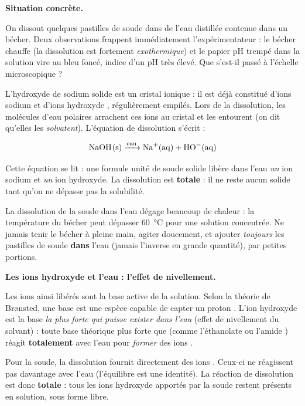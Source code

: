 \documentclass[11pt]{article}
\newcommand{\cle}[1]{{\popxbold\color{popdark}#1}}
\newcounter{popsec}
\newcounter{popsub}
\newcommand{\courssub}[1]{%
  \stepcounter{popsub}%
  \par\vspace{9pt}\noindent{\popxbold\fontsize{11.5}{13}\selectfont\color{popink}{\color{poporange}\thepopsec.\thepopsub}\hspace{6pt}#1}\par\nopagebreak\vspace{4pt}
}
\begin{document}
\courssub{Dissolution de la soude dans l'eau}

\textbf{Situation concrète.}\par
On dissout quelques pastilles de soude dans de l'eau distillée contenue dans un bécher. Deux observations frappent immédiatement l'expérimentateur : le bécher chauffe (la dissolution est fortement \emph{exothermique}) et le papier pH trempé dans la solution vire au bleu foncé, indice d'un pH très élevé. Que s'est-il passé à l'échelle microscopique ?

L'hydroxyde de sodium solide  est un \cle{cristal ionique} : il est déjà constitué d'ions sodium  et d'ions hydroxyde , régulièrement empilés. Lors de la dissolution, les molécules d'eau polaires arrachent ces ions au cristal et les entourent (on dit qu'elles les \emph{solvatent}). L'équation de dissolution s'écrit :

\[ \ce{NaOH(s) ->[eau] Na+(aq) + HO-(aq)} \]

Cette équation se lit : une formule unité de soude solide libère dans l'eau \emph{un} ion sodium et \emph{un} ion hydroxyde. La dissolution est \textbf{totale} : il ne reste aucun solide tant qu'on ne dépasse pas la solubilité.

\begin{attention}
La dissolution de la soude dans l'eau dégage beaucoup de chaleur : la température du bécher peut dépasser \SI{60}{\celsius} pour une solution concentrée. Ne jamais tenir le bécher à pleine main, agiter doucement, et ajouter \emph{toujours} les pastilles de soude \textbf{dans} l'eau (jamais l'inverse en grande quantité), par petites portions.
\end{attention}

\textbf{Les ions hydroxyde et l'eau : l'effet de nivellement.}\par
Les ions  ainsi libérés sont la base active de la solution. Selon la théorie de Brønsted, une base est une espèce capable de capter un proton . L'ion hydroxyde est la base \emph{la plus forte qui puisse exister dans l'eau} (effet de nivellement du solvant) : toute base théorique plus forte que  (comme l'éthanolate  ou l'amide ) réagit \textbf{totalement} avec l'eau pour \emph{former} des ions . 

Pour la soude, la dissolution fournit directement des ions . Ceux-ci ne réagissent pas davantage avec l'eau (l'équilibre  est une identité). La réaction de dissolution est donc \textbf{totale} : tous les ions hydroxyde apportés par la soude restent présents en solution, sous forme  libre.
\end{document}
